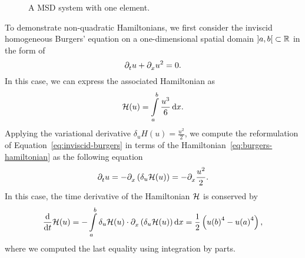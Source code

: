 \begin{example}
\begin{figure}[h]
        \caption{A \acl{MSD} system with one element.}%
        \label{fig:single-msd}
    \end{figure}
\end{example}

\begin{example}\label{ex:inviscid-burgers}
    To demonstrate non-quadratic Hamiltonians, we first consider the inviscid homogeneous Burgers' equation on a one-dimensional spatial domain $\interval[open]{a}{b} \subset \bb{R}$ in the form of
    \begin{equation}\label{eq:inviscid-burgers}
        \pd[t]{} u + \pd[x]{} u^2 = 0.
    \end{equation}
    In this case, we can express the associated Hamiltonian as
    \begin{equation}\label{eq:burgers-hamiltonian}
        \mcl{H}(u) = \int\limits_a^b \frac{u^3}{6} \dif x.
    \end{equation}
    Applying the variational derivative $\delta_u H(u) = \frac{u^2}{2}$, we compute the reformulation of Equation~\eqref{eq:inviscid-burgers} in terms of the Hamiltonian~\eqref{eq:burgers-hamiltonian} as the following equation
    \begin{equation*}
        \pd[t]{} u = - \pd{} \left( \delta_u \mcl{H}(u) \right) = -\pd{} \frac{u^2}{2}.
    \end{equation*}
    In this case, the time derivative of the Hamiltonian $\mcl{H}$ is conserved by
    \begin{equation*}
        \frac{\dif}{\dif t} \mcl{H}(u) = - \int\limits_a^b \delta_u \mcl{H}(u) \cdot \pd{} \left( \delta_u \mcl{H}(u) \right) \dif x = \frac{1}{2} \left( {u(b)}^4 - {u(a)}^4 \right),
    \end{equation*}
    where we computed the last equality using integration by parts.
\end{example}

